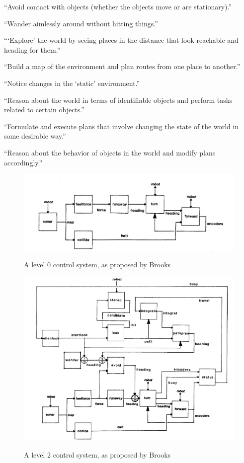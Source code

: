 \documentclass[a4paper,10pt]{article}
\begin{document}
\begin{enumerate*}
\setcounter{enumi}{-1}
\item ``Avoid contact with objects (whether the objects move or
are stationary).''
\item ``Wander aimlessly around without hitting things.''
\item ```Explore' the world by seeing places in the distance
that look reachable and heading for them.''
\item ``Build a map of the environment and plan routes from one
place to another.''
\item ``Notice changes in the `static' environment.''
\item ``Reason about the world in terms of identifiable objects
and perform tasks related to certain objects.''
\item ``Formulate and execute plans that involve changing the
state of the world in some desirable way.''
\item ``Reason about the behavior of objects in the world and
modify plans accordingly.''
\end{enumerate*}

\begin{figure}
    \centering
    \includegraphics[width=.8\textwidth]{images/level0.png}
    \label{fig:levelzero}
    \caption{A level 0 control system, as proposed by Brooks}
\end{figure}
\begin{figure}
    \centering
    \includegraphics[width=.8\textwidth]{images/level2.png}
    \label{fig:leveltwo}
    \caption{A level 2 control system, as proposed by Brooks}
\end{figure}
\end{document}
